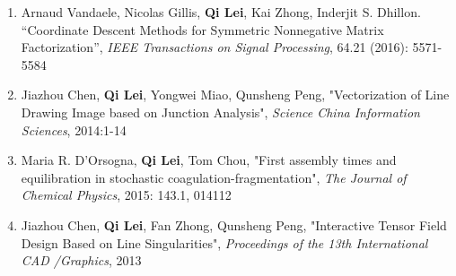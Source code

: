 \documentclass[margin, 10pt]{res} %
\begin{document}
\begin{resume}
\begin{enumerate}
	\item {Arnaud Vandaele, Nicolas Gillis, \textbf{Qi Lei},
      Kai Zhong, Inderjit S. Dhillon. ``Coordinate Descent Methods for
		Symmetric Nonnegative Matrix Factorization'', \textit{IEEE Transactions on 
Signal Processing}, 64.21 (2016): 5571-5584}	
	\item {Jiazhou Chen, \textbf{Qi Lei}, Yongwei Miao, Qunsheng Peng, "Vectorization of Line Drawing Image based on Junction Analysis", \textit{Science China Information Sciences}, 2014:1-14}
	\item {Maria R. D'Orsogna, \textbf{Qi Lei}, Tom Chou, "First assembly times and equilibration in stochastic coagulation-fragmentation", \textit{The Journal of Chemical Physics}, 2015: 143.1, 014112}
	\item {Jiazhou Chen, \textbf{Qi Lei}, Fan Zhong, Qunsheng Peng, "Interactive Tensor Field Design Based on Line Singularities", \textit{Proceedings of the 13th International CAD /Graphics}, 2013}
\end{enumerate}

\begin{comment}
\section{SOFTWARE}
 \textit{Github: }\url{https://github.com/cecilialeiqi/}\\
 {\sl SPIRAL} \hfill May 2016 - July 2017
 \begin{itemize}
   \item Feature representation learning of any time series data
    \end{itemize}
 {\sl DDI} \hfill Jan 2017 - May 2017
 \begin{itemize}
   \item Use an inductive tensor completion based methods to predict drug-drug interactions
   \end{itemize}
   {\sl NUTF} \hfill August 2016 - February 2017
   \begin{itemize}
     \item Negative-Unlabeled Tensor Factorization for Location\ Context 
       Inference from Inaccurate Mobility Data
      \end{itemize}
 \end{itemize} 
\end{comment}


\end{resume}
\end{document}
